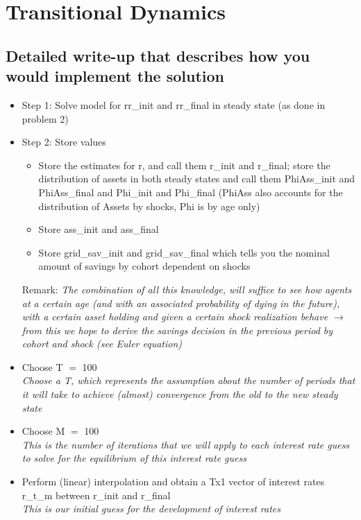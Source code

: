\documentclass[12pt,a4paper]{article}
\begin{document}
\section{Transitional Dynamics}

\subsection{Detailed write-up that describes how you would implement the solution}

\begin{itemize}
    \item Step 1: Solve model for rr\_init and rr\_final in steady state (as done in problem 2) 
    \item Step 2: Store values
    \begin{itemize}
    \item Store the estimates for r, and call them r\_init and r\_final;
    store the distribution of assets in both steady states and call them PhiAss\_init and PhiAss\_final and Phi\_init and Phi\_final (PhiAss also accounts for the distribution of Assets by shocks, Phi is by age only) 
    \item Store ass\_init and ass\_final
    \item Store grid\_sav\_init and grid\_sav\_final which tells you the nominal amount of savings by cohort dependent on shocks
    \end{itemize}
Remark: \textit{The combination of all this knowledge, will suffice to see how agents at a certain age (and with an associated probability of dying in the future), with a certain asset holding and given a certain shock realization behave $\rightarrow$ from this we hope to derive the savings decision in the previous period by cohort and shock (see Euler equation)}

\item Choose T $=$ 100 \\
\textit{Choose a T, which represents the assumption about the number of periods that it will take to achieve (almost) convergence from the old to the new steady state}

\item Choose M $=$ 100 \\
\textit{This is the number of iterations that we will apply to each interest rate guess to solve for the equilibrium of this interest rate guess}

\item Perform (linear) interpolation and obtain a Tx1 vector of interest rates r\_t\_m between r\_init and r\_final\\
\textit{This is our initial guess for the development of interest rates}


\end{itemize}
\end{document}
